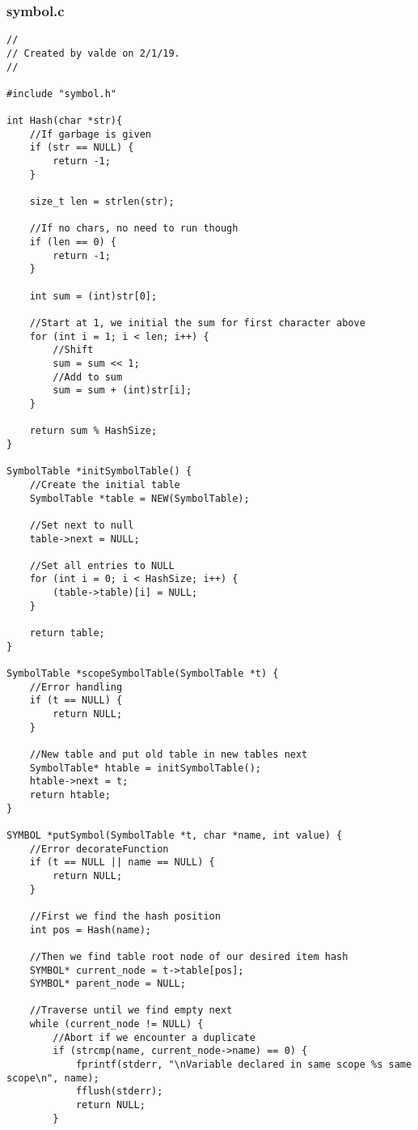 \documentclass[a4paper]{article}
\begin{document}
\subsubsection{symbol.c}
\begin{verbatim}
//
// Created by valde on 2/1/19.
//

#include "symbol.h"

int Hash(char *str){
    //If garbage is given
    if (str == NULL) {
        return -1;
    }

    size_t len = strlen(str);

    //If no chars, no need to run though
    if (len == 0) {
        return -1;
    }

    int sum = (int)str[0];

    //Start at 1, we initial the sum for first character above
    for (int i = 1; i < len; i++) {
        //Shift
        sum = sum << 1;
        //Add to sum
        sum = sum + (int)str[i];
    }

    return sum % HashSize;
}

SymbolTable *initSymbolTable() {
    //Create the initial table
    SymbolTable *table = NEW(SymbolTable);

    //Set next to null
    table->next = NULL;

    //Set all entries to NULL
    for (int i = 0; i < HashSize; i++) {
        (table->table)[i] = NULL;
    }

    return table;
}

SymbolTable *scopeSymbolTable(SymbolTable *t) {
    //Error handling
    if (t == NULL) {
        return NULL;
    }

    //New table and put old table in new tables next
    SymbolTable* htable = initSymbolTable();
    htable->next = t;
    return htable;
}

SYMBOL *putSymbol(SymbolTable *t, char *name, int value) {
    //Error decorateFunction
    if (t == NULL || name == NULL) {
        return NULL;
    }

    //First we find the hash position
    int pos = Hash(name);

    //Then we find table root node of our desired item hash
    SYMBOL* current_node = t->table[pos];
    SYMBOL* parent_node = NULL;

    //Traverse until we find empty next
    while (current_node != NULL) {
        //Abort if we encounter a duplicate
        if (strcmp(name, current_node->name) == 0) {
            fprintf(stderr, "\nVariable declared in same scope %s same scope\n", name);
            fflush(stderr);
            return NULL;
        }
        

\end{verbatim}
\end{document}
